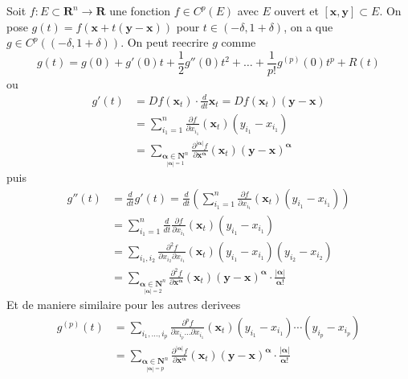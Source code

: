 Soit $f:E\subset \mathbf{R}^{n}\to \mathbf{R}$ une fonction $f\in C^{p}(E)$ avec $E$ ouvert et $[\boldsymbol{x},\boldsymbol{y}]\subset E$. On pose $g(t)=f(\boldsymbol{x}+t(\boldsymbol{y}-\boldsymbol{x}))$ pour $t\in(-\delta,1+\delta)$, on a que $g\in C^{p}((-\delta,1+\delta))$. On peut reecrire $g$ comme 
$$
g(t)=g(0)+g'(0)t+\frac{1}{2}g''(0)t^{2}+\dots +\frac{1}{p!}g^{(p)}(0)t^{p}+R(t)
$$
ou 
\begin{align*}
g'(t) & =Df(\boldsymbol{x}_{t})\cdot \frac{d}{dt}\boldsymbol{x}_{t}=Df(\boldsymbol{x}_{t})(\boldsymbol{y}-\boldsymbol{x}) \\
 & =\sum_{i_{1}=1}^{n}  \frac{ \partial f }{ \partial x_{i_{1}} } (\boldsymbol{x}_{t})(y_{i_{1}}-x_{i_{1}}) \\
 & =\sum _{\underset{|\boldsymbol{\alpha}|=1}{\boldsymbol{\alpha}\in \mathbf{N}^{n}}}  \frac{ \partial^{|\boldsymbol{\alpha}|}f }{ \partial \boldsymbol{x}^{\boldsymbol{\alpha}} } (\boldsymbol{x}_{t})(\boldsymbol{y}-\boldsymbol{x})^{\boldsymbol{\alpha}}
\end{align*}
puis
\begin{align*}
g''(t) & = \frac{d}{dt}g'(t)=\frac{d}{dt}\left( \sum_{i_{1}=1}^{n}  \frac{ \partial f }{ \partial x_{i_{1}} } (\boldsymbol{x}_{t})(y_{i_{1}}-x_{i_{1}}) \right) \\
 & =\sum_{i_{1}=1}^{n} \frac{d}{dt} \frac{ \partial f }{ \partial x_{i_{1}} } (\boldsymbol{x}_{t})(y_{i_{1}}-x_{i_{1}}) \\
 & =\sum _{i_{1},i_{2}} \frac{ \partial^{2}f }{ \partial x_{i_{2}}\partial x_{i_{1}} } (\boldsymbol{x}_{t})(y_{i_{1}}-x_{i_{1}})(y_{i_{2}}-x_{i_{2}}) \\
 & =\sum _{\underset{|\boldsymbol{\alpha}|=2}{\boldsymbol{\alpha}\in \mathbf{N}^{n}}} \frac{ \partial^{2}f }{ \partial \boldsymbol{x}^{\boldsymbol{\alpha}} }(\boldsymbol{x}_{t})(\boldsymbol{y}-\boldsymbol{x})^{\boldsymbol{\alpha}} \cdot \frac{|\boldsymbol{\alpha}|}{\boldsymbol{\alpha}!} 
\end{align*}
Et de maniere similaire pour les autres derivees
\begin{align*}
g^{(p)}(t) & =\sum _{i_{1},\dots,i_{p}} \frac{ \partial^{p}f }{ \partial x_{i_{p}}\dots \partial x_{i_{1}} }(\boldsymbol{x}_{t})(y_{i_{1}}-x_{i_{1}})\cdots(y_{i_{p}}-x_{i_{p}})  \\
 & =\sum _{\underset{|\boldsymbol{\alpha}|=p}{\boldsymbol{\alpha}\in \mathbf{N}^{n}}}  \frac{ \partial^{|\boldsymbol{\alpha}|}f }{ \partial \boldsymbol{x}^{\boldsymbol{\alpha}} }(\boldsymbol{x}_{t})(\boldsymbol{y}-\boldsymbol{x})^{\boldsymbol{\alpha}}\cdot \frac{|\boldsymbol{\alpha}|}{\boldsymbol{\alpha}!} 
\end{align*}
